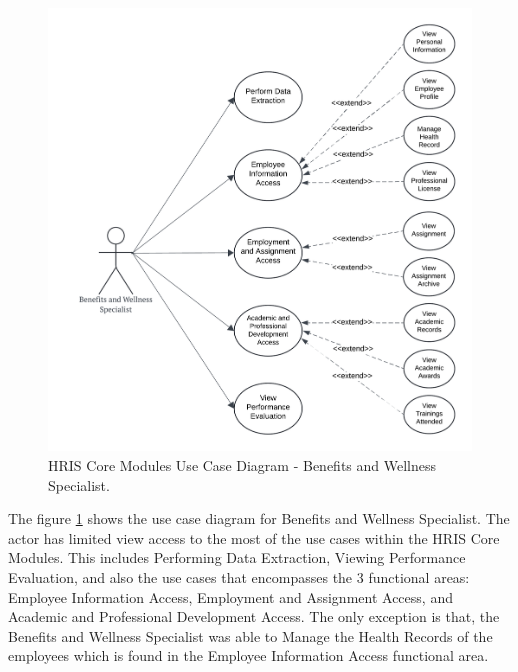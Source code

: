     \begin{figure}[H]
        \centering
        \includegraphics[width=0.9\linewidth]{figures/images/diagrams/usecase/use-case-basic-6.png}
        \caption{HRIS Core Modules Use Case Diagram - Benefits and Wellness Specialist.}
        \label{fig:use-case-basic-6}
    \end{figure}

    The figure \ref{fig:use-case-basic-6} shows the use case diagram for Benefits and Wellness Specialist. The actor has limited view access to the most of the use cases within the HRIS Core Modules. This includes Performing Data Extraction, Viewing Performance Evaluation, and also the use cases that  encompasses the 3 functional areas: Employee Information Access, Employment and Assignment Access, and Academic and Professional Development Access. The only exception is that, the Benefits and Wellness Specialist was able to Manage the Health Records of the employees which is found in the Employee Information Access functional area.

